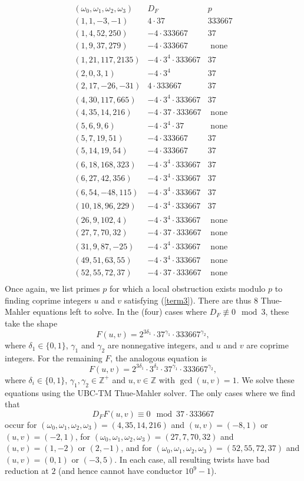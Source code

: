 $$
\begin{array}{ccc} 
(\omega_0,\omega_1,\omega_2,\omega_3) & D_F & p \\ \hline
(1,1,-3,-1) & 4 \cdot 37 & 333667 \\
(1,4,52,250) & -4 \cdot 333667 & 37 \\
(1,9,37,279) & -4 \cdot 333667 &   \mbox{ none }\\
(1,21,117,2135) & -4 \cdot 3^4 \cdot 333667 & 37  \\
(2,0,3,1) & -4 \cdot 3^4 & 37  \\
(2,17,-26,-31) & 4 \cdot 333667 & 37  \\
(4,30,117,665) & -4 \cdot 3^4 \cdot 333667 & 37 \\
(4,35,14,216) & -4 \cdot 37 \cdot 333667 & \mbox{ none }\\
(5,6,9,6) & -4 \cdot 3^4 \cdot 37 & \mbox{ none } \\ 
(5,7,19,51) & -4 \cdot 333667 & 37  \\
 (5,14,19,54) &  -4 \cdot 333667 & 37\\
 (6,18,168,323) & -4 \cdot 3^4 \cdot 333667 & 37\\
 (6,27,42,356) & -4 \cdot 3^4 \cdot 333667 & 37 \\
 (6,54,-48,115) & -4 \cdot 3^4 \cdot 333667 & 37\\
 (10,18,96,229) &  -4 \cdot 3^4 \cdot 333667 & 37\\
 (26,9,102,4) & -4 \cdot 3^4 \cdot 333667 & \mbox{ none }\\
  (27,7,70,32) & -4 \cdot 37 \cdot 333667 & \mbox{ none }\\
  (31,9,87,-25) & -4 \cdot 3^4 \cdot 333667 & \mbox{ none } \\
 (49,51,63,55) & -4 \cdot 3^4 \cdot 333667  & \mbox{ none } \\
(52,55,72,37) & -4 \cdot 37 \cdot 333667 & \mbox{ none }\\
\end{array}
$$
Once again, we list primes $p$ for which a local obstruction exists modulo $p$ to finding coprime integers  $u$ and $v$ satisfying (\ref{term3}). There are thus $8$ Thue-Mahler equations left to solve.
In the (four) cases where  $D_F \not\equiv 0 \mod{3}$, these take the shape
$$
F(u,v) = 2^{3 \delta_1} \cdot 37^{\gamma_1} \cdot 333667^{\gamma_2},
$$
where $\delta_1 \in \{ 0, 1 \}$, $\gamma_1$ and $\gamma_2$ are nonnegative integers, and $u$ and $v$ are coprime integers. For the remaining $F$, the analogous equation is
$$
F(u,v) = 2^{3 \delta_1} \cdot 3^{\delta_2} \cdot 37^{\gamma_1} \cdot 333667^{\gamma_2},
$$
where $\delta_i \in \{ 0, 1 \}$, $\gamma_1, \gamma_2 \in \mathbb{Z}^+$ and $u, v \in \mathbb{Z}$ with $\gcd(u,v)=1$. We solve these equations using the UBC-TM Thue-Mahler solver. The only cases where we find  that
$$
D_F F(u,v) \equiv 0 \mod{37 \cdot 333667}
$$
occur for $(\omega_0,\omega_1,\omega_2,\omega_3)=(4,35,14,216)$ and $(u,v)=(-8,1)$ or $(u,v)=(-2,1)$, for
 $(\omega_0,\omega_1,\omega_2,\omega_3)=(27,7,70,32)$ and $(u,v)=(1,-2)$ or $(2,-1)$, and for $(\omega_0,\omega_1,\omega_2,\omega_3)=(52,55,72,37)$ and 
 $(u,v)=(0,1)$ or $(-3,5)$. In each case, all resulting  twists have bad reduction at $2$ (and hence cannot have conductor $10^9-1$).
 
